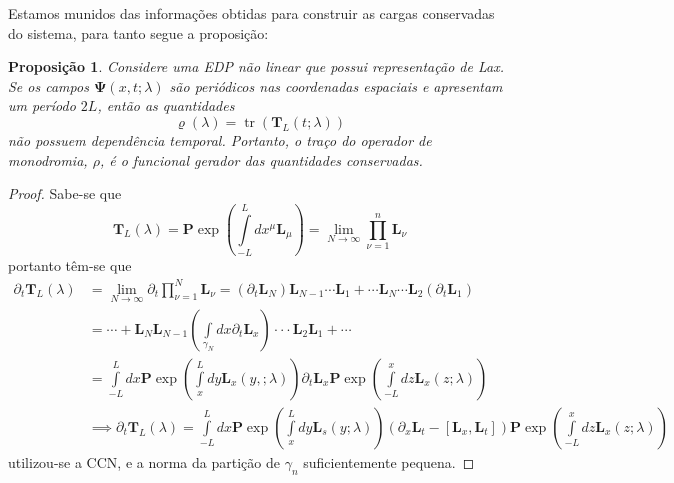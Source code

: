 \documentclass[25pt]{article}
\numberwithin{equation}{subsection} %
\DeclareMathOperator{\tr}{tr}
\newtheorem{propo}{Proposição}
\newcommand{\commutador}[2]{\left[#1,#2\right]}
\newcommand{\OP}[1]{\mathbf{#1}}
\newcommand{\Pd}[1]{\partial_{#1}}
\begin{document}
Estamos munidos das informações obtidas para construir as cargas conservadas do sistema, para tanto segue a proposição:
\begin{propo}
Considere uma EDP não linear que possui representação de Lax. Se os campos $\bm{\Psi}(x,t;\lambda)$ são periódicos nas coordenadas espaciais e apresentam um período $2L$, então as quantidades
\begin{equation}
\varrho(\lambda)=\tr\left(\OP{T}_{L}(t;\lambda)\right)
\end{equation}
não possuem dependência temporal. Portanto, o traço do operador de monodromia, $\rho$, é o funcional gerador das quantidades conservadas.
\end{propo}
\begin{proof}
Sabe-se que
\begin{equation}
\OP{T}_{L}(\lambda)=\OP{P}\exp\left(\int\limits_{-L}^{L}dx^{\mu}\OP{L}_{\mu}\right)=\lim_{N\to\infty}\prod_{\nu=1}^{n}\OP{L}_{\nu}
\end{equation}
portanto têm-se que
\begin{align}
\Pd{t}\OP{T}_{L}(\lambda)&=\lim_{N\to\infty}\Pd{t}\prod_{\nu=1}^{N}\OP{L}_{\nu}=\left(\Pd{t}\OP{L}_{N}\right)\OP{L}_{N-1}\cdots \OP{L}_{1}+\cdots \OP{L}_{N}\cdots \OP{L}_{2}\left(\Pd{t}\OP{L}_{1}\right)\\
&=\cdots+\OP{L}_{N}\OP{L}_{N-1}\left(\int\limits_{\gamma_{N}}dx\Pd{t}\OP{L}_{x}\right)\cdot\cdot\cdot \OP{L}_{2}\OP{L}_{1}+\cdots\\
&=\int\limits_{-L}^{L}dx\OP{P}\exp\left(\int\limits_{x}^{L}dy\OP{L}_{x}(y,;\lambda)\right)\Pd{t}\OP{L}_{x}\OP{P}\exp\left(\int\limits_{-L}^{x}dz\OP{L}_{x}(z;\lambda)\right)\\
&\implies \Pd{t}\OP{T}_{L}(\lambda)=\int\limits_{-L}^{L}dx\OP{P}\exp\left(\int\limits_{x}^{L}dy\OP{L}_{s}(y;\lambda)\right)\left(\Pd{x}\OP{L}_{t}-\commutador{\OP{L}_{x}}{\OP{L}_{t}}\right)\OP{P}\exp\left(\int\limits_{-L}^{x}dz\OP{L}_{x}(z;\lambda)\right)\label{estruturafeia}
\end{align}
utilizou-se a CCN, e a norma da partição de $\gamma_{n}$ suficientemente pequena.


\end{proof}
\end{document}
